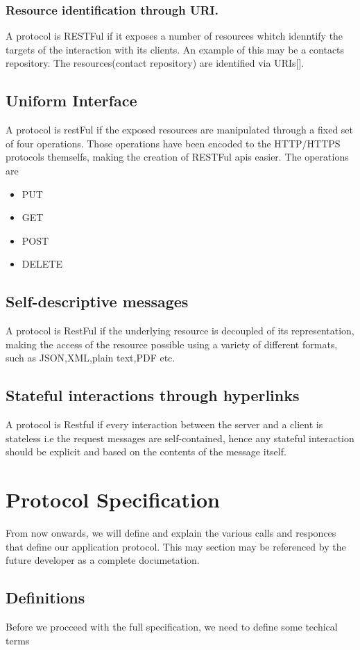 			\subsubsection{Resource identification through URI.}
				A protocol is RESTFul if it exposes a number of resources whitch idenntify the targets of the interaction with its clients. An example
				of this may be a contacts repository. The resources(contact repository) are identified via URIs[\cite{uri-rfc3986}].
			\subsection{Uniform Interface}
				A protocol is restFul if the exposed resources are manipulated through a fixed set of four operations. Those operations have been encoded
				to the HTTP/HTTPS protocols themselfs, making the creation of RESTFul apis easier. The operations are
				\begin{itemize}
					\item PUT
					\item GET
					\item POST
					\item DELETE
				\end{itemize}
			\subsection{Self-descriptive messages}
				A protocol is RestFul if the underlying resource is decoupled of its representation, making the access of the resource possible using 
				a variety of different formats, such as JSON,XML,plain text,PDF etc.
			\subsection{Stateful interactions through hyperlinks}
				A protocol is Restful if every interaction between the server and a client is stateless i.e the request messages are self-contained, hence
				any stateful interaction should be explicit and based on the contents of the message itself.
		\section{Protocol Specification}
			From now onwards, we will define and explain the various calls and responces that define our application protocol. This may section may be referenced
			by the future developer as a complete documetation.
			\subsection{Definitions}
				Before we procceed with the full specification, we need to define some techical terms
